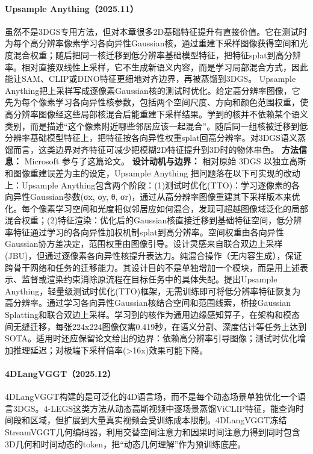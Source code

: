 \paragraph{Upsample Anything（2025.11）\cite{2511_16301}}
虽然不是3DGS专用方法，但对本章很多2D基础特征提升有直接价值。它在测试时为每个高分辨率像素学习各向异性Gaussian核，通过重建下采样图像获得空间和光度混合权重；随后把同一核迁移到低分辨率基础模型特征，把特征splat到高分辨率。相对直接双线性上采样，它不生成新语义内容，而是学习局部混合方式，因此能让SAM、CLIP或DINO特征更细地对齐边界，再被蒸馏到3DGS。
Upsample Anything把上采样写成逐像素Gaussian核的测试时优化。给定高分辨率图像，它先为每个像素学习各向异性核参数，包括两个空间尺度、方向和颜色范围权重，使高分辨率图像经这些局部核混合后能重建下采样结果。学到的核并不依赖某个语义类别，而是描述“这个像素附近哪些邻居应该一起混合”。随后同一组核被迁移到低分辨率基础模型特征上，把特征按各向异性权重splat回高分辨率。对3DGS语义蒸馏而言，这类边界对齐特征可减少把模糊2D特征提升到3D时的物体串色。
\textbf{方法信息：} Microsoft 参与了这篇论文。
\textbf{设计动机与边界：} 相对原始 3DGS 以独立高斯和图像重建误差为主的设定，Upsample Anything 把问题落在以下可实现的改动上：Upsample Anything包含两个阶段：(1)测试时优化(TTO)：学习逐像素的各向异性Gaussian参数(σx, σy, θ, σr)，通过从高分辨率图像重建其下采样版本来优化。每个像素学习空间和光度相似邻居应如何混合，发现可超越图像域泛化的局部混合权重；(2)特征渲染：优化后的Gaussian核直接迁移到基础特征空间，低分辨率特征通过学习的各向异性加权机制splat到高分辨率。空间权重由各向异性Gaussian协方差决定，范围权重由图像引导。设计灵感来自联合双边上采样(JBU)，但通过逐像素各向异性核提升表达力。纯混合操作（无内容生成），保证跨骨干网络和任务的迁移能力。其设计目的不是单独增加一个模块，而是用上述表示、监督或渲染约束消除原流程在目标任务中的具体失配。提出Upsample Anything，轻量级测试时优化(TTO)框架，无需训练即可将低分辨率特征恢复为高分辨率。通过学习各向异性Gaussian核结合空间和范围线索，桥接Gaussian Splatting和联合双边上采样。学习到的核作为通用边缘感知算子，在架构和模态间无缝迁移，每张224x224图像仅需0.419秒，在语义分割、深度估计等任务上达到SOTA。适用时还应保留论文给出的边界：依赖高分辨率引导图像；测试时优化增加推理延迟；对极端下采样倍率(>16x)效果可能下降。
\paragraph{4DLangVGGT（2025.12）\cite{2512_05060}}
4DLangVGGT构建的是可泛化的4D语言场，而不是每个动态场景单独优化一个语言3DGS。4-LEGS这类方法从动态高斯视频中逐场景蒸馏ViCLIP特征，能查询时间段和区域，但扩展到大量真实视频会受训练成本限制。4DLangVGGT冻结StreamVGGT几何编码器，利用交替空间注意力和因果时间注意力得到同时包含3D几何和时间动态的token，把“动态几何理解”作为预训练底座。

